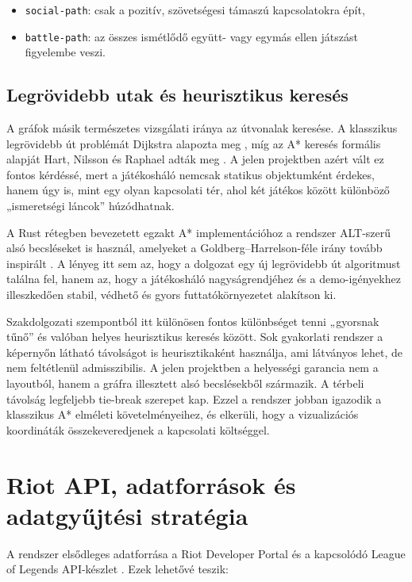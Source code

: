 \documentclass[a4paper,12pt]{report}
\begin{document}
\begin{itemize}
    \item \texttt{social-path}: csak a pozitív, szövetségesi támaszú kapcsolatokra épít,
    \item \texttt{battle-path}: az összes ismétlődő együtt- vagy egymás ellen játszást figyelembe veszi.
\end{itemize}

\section{Legrövidebb utak és heurisztikus keresés}

A gráfok másik természetes vizsgálati iránya az útvonalak keresése. A klasszikus legrövidebb út problémát Dijkstra alapozta meg \cite{dijkstra1959}, míg az A* keresés formális alapját Hart, Nilsson és Raphael adták meg \cite{hart1968}. A jelen projektben azért vált ez fontos kérdéssé, mert a játékosháló nemcsak statikus objektumként érdekes, hanem úgy is, mint egy olyan kapcsolati tér, ahol két játékos között különböző „ismeretségi láncok” húzódhatnak.

A Rust rétegben bevezetett egzakt A* implementációhoz a rendszer ALT-szerű alsó becsléseket is használ, amelyeket a Goldberg--Harrelson-féle irány tovább inspirált \cite{goldberg2005}. A lényeg itt sem az, hogy a dolgozat egy új legrövidebb út algoritmust találna fel, hanem az, hogy a játékosháló nagyságrendjéhez és a demo-igényekhez illeszkedően stabil, védhető és gyors futtatókörnyezetet alakítson ki.

Szakdolgozati szempontból itt különösen fontos különbséget tenni „gyorsnak tűnő” és valóban helyes heurisztikus keresés között. Sok gyakorlati rendszer a képernyőn látható távolságot is heurisztikaként használja, ami látványos lehet, de nem feltétlenül admisszibilis. A jelen projektben a helyességi garancia nem a layoutból, hanem a gráfra illesztett alsó becslésekből származik. A térbeli távolság legfeljebb tie-break szerepet kap. Ezzel a rendszer jobban igazodik a klasszikus A* elméleti követelményeihez, és elkerüli, hogy a vizualizációs koordináták összekeveredjenek a kapcsolati költséggel.

\chapter{Riot API, adatforrások és adatgyűjtési stratégia}

A rendszer elsődleges adatforrása a Riot Developer Portal és a kapcsolódó League of Legends API-készlet \cite{riotportal,riotapi}. Ezek lehetővé teszik:
\end{document}
